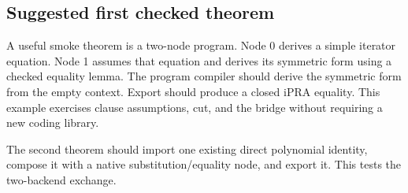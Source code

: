 \subsection{Suggested first checked theorem}

A useful smoke theorem is a two-node program.  Node 0 derives a simple iterator
equation.  Node 1 assumes that equation and derives its symmetric form using a
checked equality lemma.  The program compiler should derive the symmetric form
from the empty context.  Export should produce a closed iPRA equality.  This
example exercises clause assumptions, cut, and the bridge without requiring a
new coding library.

The second theorem should import one existing direct polynomial identity,
compose it with a native substitution/equality node, and export it.  This tests
the two-backend exchange.
